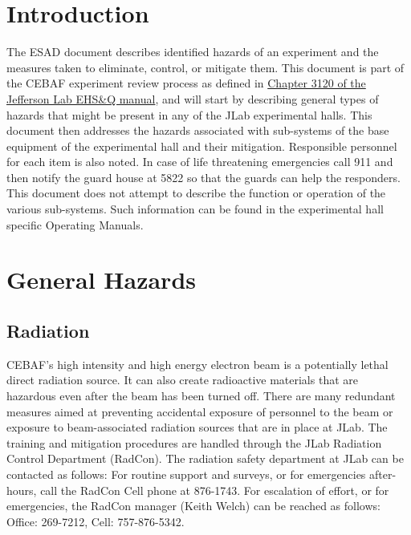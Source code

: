 
%
%
%

\chapter{Introduction}

The ESAD document describes identified hazards of an experiment and the measures taken to eliminate, control, or mitigate them.
This document is part of the CEBAF experiment review process as defined in
\href{http://www.jlab.org/ehs/ehsmanual/manual/3120.html}{Chapter 3120 of the Jefferson Lab EHS\&Q manual},
and will start by describing general types of hazards that might be present in any of the  
JLab experimental halls.  This document then addresses the hazards associated 
with sub-systems of the base equipment of the experimental hall and their 
mitigation.  Responsible personnel for each item is also noted.  
In case of life threatening 
emergencies call 911 and then notify the guard house at 5822 so that the guards can help
the responders.  This document does not attempt to describe the function 
or operation of the various sub-systems. Such information can be found in
the experimental hall specific Operating Manuals.


\chapter{General Hazards}

\section{Radiation}
	
CEBAF's high intensity and high energy electron beam is a potentially lethal direct radiation source. 
It can also create radioactive materials that are hazardous even  after the beam has been turned off. 
There are many redundant measures aimed at preventing accidental exposure of personnel to the beam 
or exposure to beam-associated radiation sources that are in place at JLab. The training and mitigation 
procedures are handled through the JLab Radiation Control Department (RadCon). The radiation safety 
department at JLab can be contacted as follows: For routine support and surveys, or for emergencies 
after-hours, call the RadCon Cell phone at 876-1743. For escalation of effort, or for emergencies, 
the RadCon manager (Keith Welch) can be reached as follows: Office: 269-7212, Cell: 757-876-5342.

